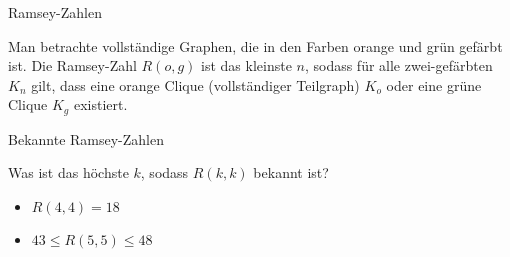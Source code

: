 \begin{frame}{Ramsey-Zahlen}

	\begin{definition}
		\vspace{0.25cm}
		Man betrachte vollständige Graphen, die in den Farben orange und grün gefärbt ist. Die Ramsey-Zahl $R(o, g)$ ist das kleinste $n$, sodass für alle zwei-gefärbten $K_n$ gilt, dass eine orange Clique (vollständiger Teilgraph) $K_o$ oder eine grüne Clique $K_g$ existiert.
	\end{definition}

\end{frame}


\begin{frame}{Bekannte Ramsey-Zahlen}

Was ist das höchste $k$, sodass $R(k,k)$ bekannt ist?


\begin{itemize}
\item<2-> {$R(4,4) =18$}
\item<3-> {$43 \leq R(5,5) \leq 48$}
\end{itemize}



\end{frame}


